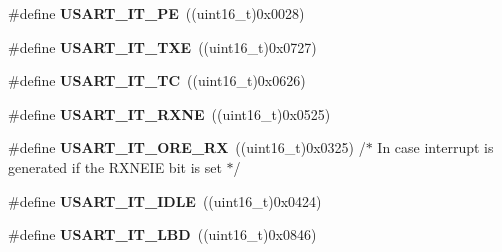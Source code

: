 \begin{DoxyCompactItemize}
\item 
\hypertarget{group___u_s_a_r_t___interrupt__definition_gae607c28a462c224c575b7541dc4f7067}{}\#define {\bfseries U\+S\+A\+R\+T\+\_\+\+I\+T\+\_\+\+P\+E}~((uint16\+\_\+t)0x0028)\label{group___u_s_a_r_t___interrupt__definition_gae607c28a462c224c575b7541dc4f7067}

\item 
\hypertarget{group___u_s_a_r_t___interrupt__definition_gab18d0fe889204a4c34f6d5817fb5147d}{}\#define {\bfseries U\+S\+A\+R\+T\+\_\+\+I\+T\+\_\+\+T\+X\+E}~((uint16\+\_\+t)0x0727)\label{group___u_s_a_r_t___interrupt__definition_gab18d0fe889204a4c34f6d5817fb5147d}

\item 
\hypertarget{group___u_s_a_r_t___interrupt__definition_ga748e86162cc110513330079982821c39}{}\#define {\bfseries U\+S\+A\+R\+T\+\_\+\+I\+T\+\_\+\+T\+C}~((uint16\+\_\+t)0x0626)\label{group___u_s_a_r_t___interrupt__definition_ga748e86162cc110513330079982821c39}

\item 
\hypertarget{group___u_s_a_r_t___interrupt__definition_gacdd49b93072655a21a63a35e6431f8ae}{}\#define {\bfseries U\+S\+A\+R\+T\+\_\+\+I\+T\+\_\+\+R\+X\+N\+E}~((uint16\+\_\+t)0x0525)\label{group___u_s_a_r_t___interrupt__definition_gacdd49b93072655a21a63a35e6431f8ae}

\item 
\hypertarget{group___u_s_a_r_t___interrupt__definition_gaad8fd44c80b30285dc3088a0b3aa5bd9}{}\#define {\bfseries U\+S\+A\+R\+T\+\_\+\+I\+T\+\_\+\+O\+R\+E\+\_\+\+R\+X}~((uint16\+\_\+t)0x0325) /$\ast$ In case interrupt is generated if the R\+X\+N\+E\+I\+E bit is set $\ast$/\label{group___u_s_a_r_t___interrupt__definition_gaad8fd44c80b30285dc3088a0b3aa5bd9}

\item 
\hypertarget{group___u_s_a_r_t___interrupt__definition_ga5d85aab24b7b2dfddb61ba2a49fa6185}{}\#define {\bfseries U\+S\+A\+R\+T\+\_\+\+I\+T\+\_\+\+I\+D\+L\+E}~((uint16\+\_\+t)0x0424)\label{group___u_s_a_r_t___interrupt__definition_ga5d85aab24b7b2dfddb61ba2a49fa6185}

\item 
\hypertarget{group___u_s_a_r_t___interrupt__definition_ga063628e16cdda199b07d380421afc4a5}{}\#define {\bfseries U\+S\+A\+R\+T\+\_\+\+I\+T\+\_\+\+L\+B\+D}~((uint16\+\_\+t)0x0846)\label{group___u_s_a_r_t___interrupt__definition_ga063628e16cdda199b07d380421afc4a5}


\end{DoxyCompactItemize}
